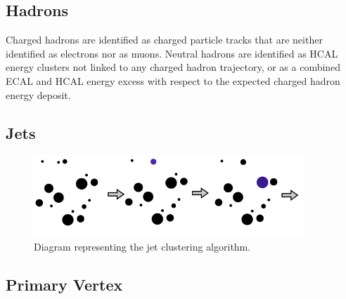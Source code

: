 \subsection{Hadrons}
Charged hadrons are identified as charged particle tracks that are neither identified as electrons nor as muons. Neutral hadrons are identified as HCAL energy clusters not linked to any charged hadron trajectory, or as a combined ECAL and HCAL energy excess with respect to the expected charged hadron energy deposit.

\subsection{Jets}

\begin{figure}
  \centering
   \includegraphics[width=0.9\textwidth]{fig/experiment/reconstruction/jet_clustering.png}
	\caption{Diagram representing the jet clustering algorithm.}
\end{figure}

\subsection{Primary Vertex}
